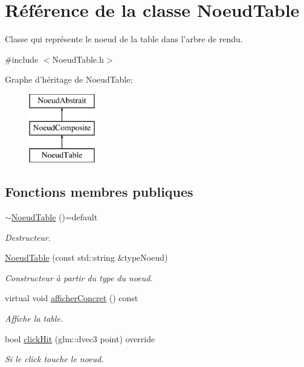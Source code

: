 \hypertarget{class_noeud_table}{\section{Référence de la classe Noeud\-Table}
\label{class_noeud_table}
}


Classe qui représente le noeud de la table dans l'arbre de rendu.  




{\ttfamily \#include $<$Noeud\-Table.\-h$>$}

Graphe d'héritage de Noeud\-Table\-:\begin{figure}[H]
\begin{center}
\leavevmode
\includegraphics[height=3.000000cm]{class_noeud_table}
\end{center}
\end{figure}
\subsection*{Fonctions membres publiques}
\begin{DoxyCompactItemize}
\item 
\hypertarget{class_noeud_table_a158d42536136842f7882c9694240d798}{\hyperlink{class_noeud_table_a158d42536136842f7882c9694240d798}{$\sim$\-Noeud\-Table} ()=default}\label{class_noeud_table_a158d42536136842f7882c9694240d798}

\begin{DoxyCompactList}\small\item\em Destructeur. \end{DoxyCompactList}\end{DoxyCompactItemize}
{\bf }\par
\begin{DoxyCompactItemize}
\item 
\hyperlink{class_noeud_table_a40983870720b331d17daeeb306e12ef5}{Noeud\-Table} (const std\-::string \&type\-Noeud)
\begin{DoxyCompactList}\small\item\em Constructeur à partir du type du noeud. \end{DoxyCompactList}\item 
virtual void \hyperlink{class_noeud_table_aa2876d070dd6fe57b0b90077fcd5036d}{afficher\-Concret} () const 
\begin{DoxyCompactList}\small\item\em Affiche la table. \end{DoxyCompactList}\item 
bool \hyperlink{class_noeud_table_a530697e3f64409dc8bb11fb6fa7c234c}{click\-Hit} (glm\-::dvec3 point) override
\begin{DoxyCompactList}\small\item\em Si le click touche le noeud. \end{DoxyCompactList}\end{DoxyCompactItemize}

